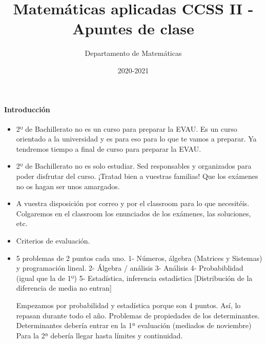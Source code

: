 \documentclass[nobuilddate]{Docencia}
\title{Matemáticas aplicadas CCSS II - Apuntes de clase}
\author{Departamento de Matemáticas}
\date{2020-2021}
\begin{document}
\pagestyle{plain}
\maketitle
\tableofcontents
\newpage

\newcommand{\hide}[1]{#1}

\renewcommand{\vec}[1]{\overrightarrow{#1}}

\paragraph{Introducción}

\begin{itemize}
    \item 2º de Bachillerato no es un curso para preparar la EVAU. Es un curso orientado a la universidad y es para eso para lo que te vamos a preparar. 
    Ya tendremos tiempo a final de curso para preparar la EVAU.
    
    \item 2º de Bachillerato no es solo estudiar. Sed responsables y organizados para poder disfrutar del curso. ¡Tratad bien a vuestras familias! Que los exámenes no os hagan ser unos amargados.
    
    \item A vuestra disposición por correo y por el classroom para lo que necesitéis. Colgaremos en el classroom los enunciados de los exámenes, las soluciones, etc.
    
    \item Criterios de evaluación. 

    \item 

    5 problemas de 2 puntos cada uno.
1-  Números, álgebra (Matrices y Sistemas) y programación lineal.
2-  Álgebra / análisis
3-  Análisis
4-  Probabiblidad (igual que la de 1º)
5-  Estadística, inferencia estadística [Distribución de la diferencia de media no entran]

Empezamos por probabilidad y estadística porque son 4 puntos. Así, lo repasan durante todo el año.
Problemas de propiedades de los determinantes.
Determinantes debería entrar en la 1ª evaluación (mediados de noviembre)
Para la 2ª debería llegar hasta límites y continuidad.

\end{itemize}




%
%
%
%

\newpage
\printindex
\listoffigures
\listoftables
\end{document}
